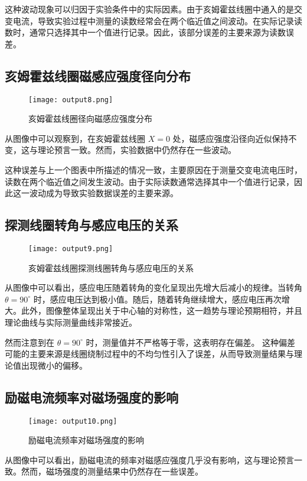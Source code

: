 \documentclass[UTF-8,twoside,cs4size]{ctexart}
\begin{document}
这种波动现象可以归因于实验条件中的实际因素。由于亥姆霍兹线圈中通入的是交变电流，导致实验过程中测量的读数经常会在两个临近值之间波动。在实际记录读数时，通常只选择其中一个值进行记录。因此，该部分误差的主要来源为读数误差。
\subsection{亥姆霍兹线圈磁感应强度径向分布}
\begin{figure}[!h]
    \centering
    \texttt{[image: output8.png]}
    \caption{亥姆霍兹线圈径向磁感应强度分布}
\end{figure}
从图像中可以观察到，在亥姆霍兹线圈 $X = 0$ 处，磁感应强度沿径向近似保持不变，这与理论预言一致。然而，实验数据中仍然存在一些波动。 \par

这种误差与上一个图表中所描述的情况一致，主要原因在于测量交变电流电压时，读数在两个临近值之间发生波动。由于实际读数通常选择其中一个值进行记录，因此这一波动成为导致实验数据误差的主要来源。
\newpage

\subsection{探测线圈转角与感应电压的关系}
\begin{figure}[!h]
    \centering
    \texttt{[image: output9.png]}
    \caption{亥姆霍兹线圈探测线圈转角与感应电压的关系}
\end{figure}
从图像中可以看出，感应电压随着转角的变化呈现出先增大后减小的规律。当转角 $\theta = 90^\circ$ 时，感应电压达到极小值。随后，随着转角继续增大，感应电压再次增大。此外，图像整体呈现出关于中心轴的对称性，这一趋势与理论预期相符，并且理论曲线与实际测量曲线非常接近。\par

然而注意到在 $\theta = 90^\circ$ 时，测量值并不严格等于零，这表明存在偏差。
这种偏差可能的主要来源是线圈绕制过程中的不均匀性引入了误差，从而导致测量结果与理论值出现微小的偏移。

\subsection{励磁电流频率对磁场强度的影响}
\begin{figure}[!h]
    \centering
    \texttt{[image: output10.png]}
    \caption{励磁电流频率对磁场强度的影响}
\end{figure}
从图像中可以看出，励磁电流的频率对磁感应强度几乎没有影响，这与理论预言一致。然而，磁场强度的测量结果中仍然存在一些误差。\par
\end{document}
